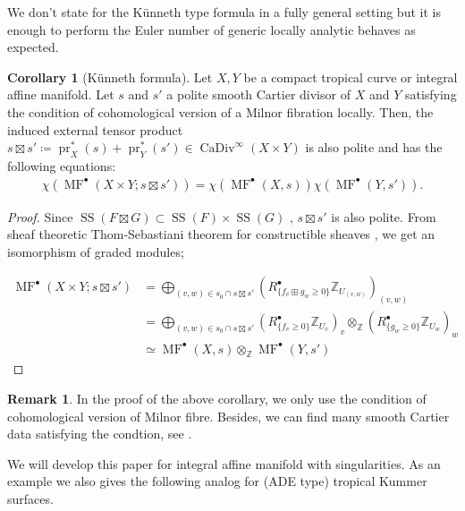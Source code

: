 \documentclass[a4paper,dvipdfmx,reqno,12pt]{amsart}
\theoremstyle{definition}
\newtheorem{Cor}[Thm]{Corollary}
\newtheorem{Rmk}[Thm]{Remark}
\newcommand{\deq}{\coloneqq}
\newcommand{\Z}{\mathbb{Z}}%
\newcommand{\opn}[1]{\operatorname{#1}}
\numberwithin{equation}{section}
\begin{document}
We don't state for the K\"unneth type formula in a fully
general setting but it is enough to perform the Euler number of
generic locally analytic  behaves as expected.
\begin{Cor}[{K\"unneth formula}]
Let $X,Y$ be a compact tropical curve or integral affine manifold.
Let $s$ and $s'$ a polite smooth Cartier divisor of $X$ and $Y$ 
satisfying the condition of cohomological version of a Milnor 
fibration \cite[Assumption 1.1.1]{MR2031639} locally.
Then, the induced external tensor product 
$s\boxtimes s'\deq \opn{pr}_X^{*} (s)+\opn{pr}_Y^{*}(s')
\in \opn{CaDiv}^{\infty}(X\times Y)$ is also polite and
has the following equations:
\begin{align}
\chi(\opn{MF}^{\bullet}(X\times Y;s\boxtimes s'))=
\chi(\opn{MF}^{\bullet}(X,s))\chi(\opn{MF}^{\bullet}(Y,s')).
\end{align}

\end{Cor}
\begin{proof}
Since 
$\opn{SS}(F\boxtimes G)\subset \opn{SS}(F)\times \opn{SS}(G)$
\cite[Proposition 5.4.1]{MR1299726},
$s\boxtimes s'$ is also polite.
From sheaf theoretic Thom-Sebastiani theorem for constructible sheaves 
\cite[Corollary 1.2.1]{MR2031639}, we get an isomorphism of 
graded modules;

\begin{align}
\opn{MF}^{\bullet}(X\times Y;s\boxtimes s') 
& =\bigoplus_{(v,w)\in s_0\cap s\boxtimes s'}
(R^{\bullet}_{\{f_v\boxplus g_w\geq 0\}}\Z_{U_{(v,w)}})_{(v,w)} \\
& =\bigoplus_{(v,w)\in s_0\cap s\boxtimes s'}
(R^{\bullet}_{\{f_v\geq 0\}}\Z_{U_v})_v
\otimes_{\Z} (R^{\bullet}_{\{g_w\geq 0\}}\Z_{U_w})_w \\
& \simeq
\opn{MF}^{\bullet}(X,s)\otimes_{\Z} \opn{MF}^{\bullet}(Y,s') 
\end{align}

\end{proof}

\begin{Rmk}
In the proof of the above corollary, we only use
the condition of cohomological version of Milnor fibre. 
Besides, we can find many smooth Cartier data satisfying 
the condtion, see \cite[p.35]{MR2031639}.  
\end{Rmk}

We will develop this paper for integral affine manifold
with singularities. As an example we also gives the 
following analog for (ADE type) tropical Kummer surfaces.
\end{document}
